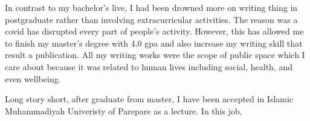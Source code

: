\documentclass[12pt]{simart} %
\begin{document}
In contrast to my bachelor's live, I had been drowned more on writing thing in postgraduate rather than involving extracurricular activities. The reason was a covid has disrupted every part of people's activity. However, this has allowed me to finish my master's degree with 4.0 gpa and also increase my writing skill that result a publication. All my writing works were the scope of public space which I care about because it was related to human lives including social, health, and even wellbeing.

Long story short, after graduate from master, I have been accepted in Islamic Muhammadiyah Univeristy of Parepare as a lecture. In this job,



\end{document}
